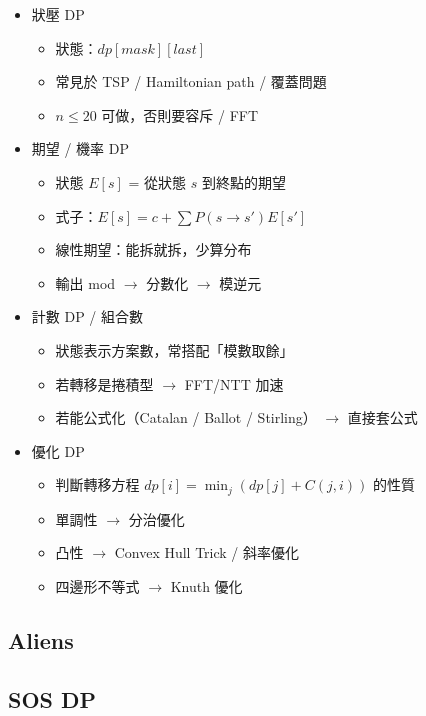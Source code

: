 \documentclass[a4paper,10pt,twocolumn,oneside]{article}
\begin{document}
\begin{itemize}[nolistsep]
    \item 狀壓 DP  
        \begin{itemize}[nolistsep]
            \item 狀態：$dp[mask][last]$  
            \item 常見於 TSP / Hamiltonian path / 覆蓋問題  
            \item $n \le 20$ 可做，否則要容斥 / FFT  
        \end{itemize}
    \item 期望 / 機率 DP  
        \begin{itemize}[nolistsep]
            \item 狀態 $E[s]$ = 從狀態 $s$ 到終點的期望  
            \item 式子：$E[s] = c + \sum P(s \to s') E[s']$  
            \item 線性期望：能拆就拆，少算分布  
            \item 輸出 mod $\rightarrow$ 分數化 $\rightarrow$  模逆元  
        \end{itemize}
    \item 計數 DP / 組合數  
        \begin{itemize}[nolistsep]
            \item 狀態表示方案數，常搭配「模數取餘」  
            \item 若轉移是捲積型 $\rightarrow$ FFT/NTT 加速  
            \item 若能公式化（Catalan / Ballot / Stirling） $\rightarrow$ 直接套公式  
        \end{itemize}
    \item 優化 DP  
        \begin{itemize}[nolistsep]
            \item 判斷轉移方程 $dp[i] = \min_j (dp[j] + C(j,i))$ 的性質  
            \item 單調性 $\rightarrow$ 分治優化  
            \item 凸性 $\rightarrow$ Convex Hull Trick / 斜率優化  
            \item 四邊形不等式 $\rightarrow$ Knuth 優化  
        \end{itemize}
\end{itemize}

\subsection{Aliens}


\subsection{SOS DP}

\end{document}
